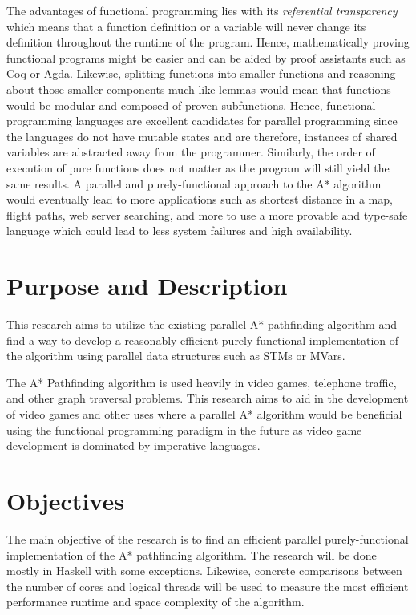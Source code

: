 The advantages of functional programming lies with its \emph{referential transparency} which means that 
a function definition or a variable will never change its definition throughout the runtime of the program.\cite{Kesseler1996,Hammond2011}
Hence, mathematically proving functional programs might be easier and can be aided by proof assistants such as  
Coq or Agda.\cite{Breitner2018,SpectorZabusky2018,ElBakouny2017} Likewise, splitting functions into smaller functions and 
reasoning about those smaller components much like lemmas would mean that functions would be modular and composed of 
proven subfunctions.\cite{AbelBenkeBove2005,Hughes1989} Hence, functional programming languages are 
excellent candidates for parallel programming since the languages do not have mutable states and are therefore, instances of
shared variables are abstracted away from the programmer. Similarly, the order of execution of pure functions does not matter 
as the program will still yield the same results.\cite{Kesseler1996} 
A parallel and purely-functional approach to the A* algorithm would eventually lead to more applications such as
shortest distance in a map, flight paths, web server searching, and more to use a more provable and type-safe language which 
could lead to less system failures and high availability.

\section{Purpose and Description}

This research aims to utilize the existing parallel A* pathfinding algorithm
\cite{ZaghloulAlJami2017,WeinstockHolladay}
and find a way to develop a reasonably-efficient purely-functional 
implementation of the algorithm using parallel data structures such 
as STMs or MVars\cite{Marlow2013}.  

The A* Pathfinding algorithm is used heavily in video games, telephone traffic, 
and other graph traversal problems\cite{HartNilssonRaphael1968}. This research 
aims to aid in the development of video games and other uses where a parallel 
A* algorithm would be beneficial using the functional 
programming paradigm in the future as video game development is dominated 
by imperative languages.

\section{Objectives}
The main objective of the research is to find an efficient parallel purely-functional implementation 
of the A* pathfinding algorithm. The research will be done mostly in Haskell with some exceptions.
Likewise, concrete comparisons between the number of cores and logical threads will be used to measure 
the most efficient performance runtime and space complexity of the algorithm.

